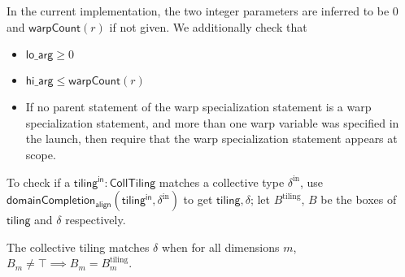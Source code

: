 \filbreak
In the current implementation, the two integer parameters are inferred to be $0$ and $\mathsf{warpCount}(r)$ if not given.
We additionally check that
\begin{itemize}
  \item $\mathsf{lo\_arg} \ge 0$
  \filbreak
  \item $\mathsf{hi\_arg} \le \mathsf{warpCount}(r)$
  \filbreak
  \item If no parent statement of the warp specialization statement is a warp specialization statement, and more than one warp variable was specified in the  launch, then require that the warp specialization statement appears at  scope.
\end{itemize}

\filbreak
{}

To check if a $\mathsf{tiling^{in}}: \mathsf{CollTiling}$ matches a collective type $\delta^\text{in}$, use $\mathsf{domainCompletion_{align}}(\mathsf{tiling^{in}}, \delta^\text{in})$ to get $\mathsf{tiling}, \delta$; let $B^\text{tiling}$, $B$ be the boxes of $\mathsf{tiling}$ and $\delta$ respectively.

The collective tiling matches $\delta$ when for all dimensions $m$, $B_m \ne \top \implies B_m = B_m^\text{tiling}$.


